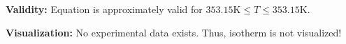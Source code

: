 \textbf{Validity:}
\newline
Equation is approximately valid for $353.15 \si{\kelvin} \leq T \leq 353.15 \si{\kelvin}$.
\newline

\textbf{Visualization:}
%
\newline
No experimental data exists. Thus, isotherm is not visualized!
%

\FloatBarrier
\newpage
